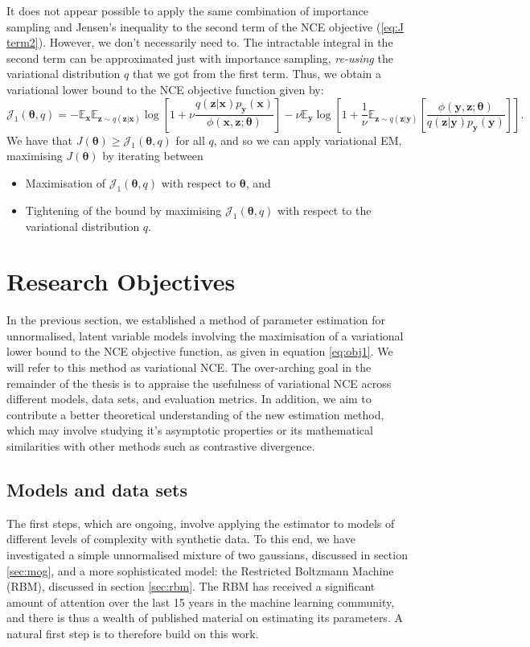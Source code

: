 \documentclass[11pt, oneside]{article}
\newcommand{\thetab}{{\boldsymbol{\theta}}}
\newcommand{\pnn}{\phi}
\newcommand{\pnoise}{p_{ \mathbf y}}
\newcommand{\x}{{\mathbf x}}
\newcommand{\y}{{\mathbf y}}
\newcommand{\z}{{\mathbf z}}
\newcommand{\E}{\mathbb{E}}
\newcommand{\Ex}{\E_{\x}}
\newcommand{\Ey}{\E_{\y}}
\newcommand{\J}{\mathcal{J}}
\begin{document}
It does not appear possible to apply the same combination of importance sampling and Jensen's inequality to the second term of the NCE objective (\ref{eq:J term2}). However, we don’t necessarily need to. The intractable integral in the second term can be approximated just with importance sampling, \emph{re-using} the variational distribution $q$ that we got from the first term. Thus, we obtain a variational lower bound to the NCE objective function given by:
\begin{equation}
  \J_1(\thetab, q) = -\Ex \E_{\z \sim q(\z|\x)} \log \left[1+\nu \frac{q(\z|\x)\pnoise(\x)}{\pnn(\x,\z; \thetab)}\right] -  \nu \Ey \log \left[1+\frac{1}{\nu} \E_{\z \sim q(\z | \y)} \left[\frac{\pnn(\y,\z; \thetab)} {q(\z | \y)\pnoise(\y)} \right]  \right].
  \label{eq:obj1}
\end{equation}
We have that $J(\thetab) \ge \J_1(\thetab, q)$ for all $q$, and so we can apply variational EM, maximising $J(\thetab)$ by iterating between
\begin{itemize}
  \item Maximisation of $\J_1(\thetab,q)$ with respect to $\thetab$, and
  \item Tightening of the bound by maximising $\J_1(\thetab,q)$ with respect to the variational distribution $q$.
\end{itemize}


\section{Research Objectives}
\label{sec:research objectives}
In the previous section, we established a method of parameter estimation for unnormalised, latent variable models involving the maximisation of a variational lower bound to the NCE objective function, as given in equation \ref{eq:obj1}. We will refer to this method as variational NCE. The over-arching goal in the remainder of the thesis is to appraise the usefulness of variational NCE across different models, data sets, and evaluation metrics. In addition, we aim to contribute a better theoretical understanding of the new estimation method, which may involve studying it's asymptotic properties or its mathematical similarities with other methods such as contrastive divergence.

\subsection{Models and data sets}
The first steps, which are ongoing, involve applying the estimator to models of different levels of complexity with synthetic data. To this end, we have investigated a simple unnormalised mixture of two gaussians, discussed in section \ref{sec:mog}, and a more sophisticated model: the Restricted Boltzmann Machine (RBM), discussed in section \ref{sec:rbm}. The RBM has received a significant amount of attention over the last 15 years in the machine learning community, and there is thus a wealth of published material on estimating its parameters. A natural first step is to therefore build on this work.
\end{document}
